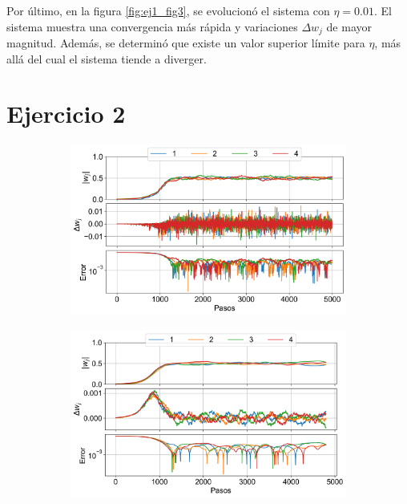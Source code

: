 \documentclass[aps,prb,twocolumn,superscriptaddress,floatfix,longbibliography]{revtex4-2}
\newcounter{para}
\begin{document}
Por último, en la figura \ref{fig:ej1_fig3}, se evolucionó el sistema con $\eta = 0.01$. El sistema muestra una convergencia más rápida y variaciones $\Delta w_j$ de mayor magnitud. Además, se determinó que existe un valor superior límite para $\eta$, más allá del cual el sistema tiende a diverger.

\section*{Ejercicio 2}


\onecolumngrid


\begin{figure}
  \centering
  \begin{subfigure}[b]{0.3\textwidth}
      \centering
      \includegraphics[width=\textwidth]{ej1_fig1.png}
      \caption{\label{fig:ej1_fig1}}
  \end{subfigure}
  \hfill
  \begin{subfigure}[b]{0.3\textwidth}
      \centering
      \includegraphics[width=\textwidth]{ej1_fig2.png}

\end{subfigure}
\end{figure}
\end{document}
